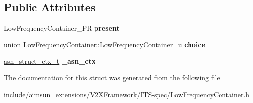 \subsection*{Public Attributes}
\begin{DoxyCompactItemize}
\item 
Low\+Frequency\+Container\+\_\+\+PR {\bfseries present}\hypertarget{structLowFrequencyContainer_af653386cbb2d556e1639e36fe351e9d5}{}\label{structLowFrequencyContainer_af653386cbb2d556e1639e36fe351e9d5}

\item 
union \hyperlink{unionLowFrequencyContainer_1_1LowFrequencyContainer__u}{Low\+Frequency\+Container\+::\+Low\+Frequency\+Container\+\_\+u} {\bfseries choice}\hypertarget{structLowFrequencyContainer_ad7ef56d7e21b60c4d98a77ae158756f3}{}\label{structLowFrequencyContainer_ad7ef56d7e21b60c4d98a77ae158756f3}

\item 
\hyperlink{structasn__struct__ctx__s}{asn\+\_\+struct\+\_\+ctx\+\_\+t} {\bfseries \+\_\+asn\+\_\+ctx}\hypertarget{structLowFrequencyContainer_abd4cbb90c1611cf37304f2f1e838c44b}{}\label{structLowFrequencyContainer_abd4cbb90c1611cf37304f2f1e838c44b}

\end{DoxyCompactItemize}


The documentation for this struct was generated from the following file\+:\begin{DoxyCompactItemize}
\item 
include/aimsun\+\_\+extensions/\+V2\+X\+Framework/\+I\+T\+S-\/spec/Low\+Frequency\+Container.\+h\end{DoxyCompactItemize}
